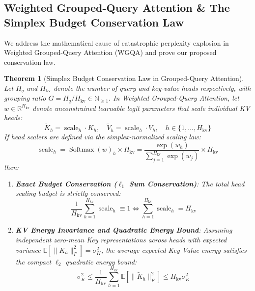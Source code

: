 \documentclass{article}
\newtheorem{theorem}{Theorem}
\begin{document}
\subsection{Weighted Grouped-Query Attention \& The Simplex Budget Conservation Law}
We address the mathematical cause of catastrophic perplexity explosion in Weighted Grouped-Query Attention (WGQA) and prove our proposed conservation law.

\begin{theorem}[Simplex Budget Conservation Law in Grouped-Query Attention]
\label{thm:simplex_conservation}
Let $H_q$ and $H_{\text{kv}}$ denote the number of query and key-value heads respectively, with grouping ratio $G = H_q / H_{\text{kv}} \in \mathbb{N}_{\ge 1}$. In Weighted Grouped-Query Attention, let $w \in \mathbb{R}^{H_{\text{kv}}}$ denote unconstrained learnable logit parameters that scale individual KV heads:
\begin{equation}
    \tilde{K}_h = \operatorname{scale}_h \cdot K_h, \quad \tilde{V}_h = \operatorname{scale}_h \cdot V_h, \quad h \in \{1, \dots, H_{\text{kv}}\}
\end{equation}
If head scalers are defined via the simplex-normalized scaling law:
\begin{equation}
    \operatorname{scale}_h = \operatorname{Softmax}(w)_h \times H_{\text{kv}} = \frac{\exp(w_h)}{\sum_{j=1}^{H_{\text{kv}}} \exp(w_j)} \times H_{\text{kv}}
\end{equation}
then:
\begin{enumerate}
    \item \textbf{Exact Budget Conservation ($\ell_1$ Sum Conservation)}: The total head scaling budget is strictly conserved:
    \begin{equation}
        \frac{1}{H_{\text{kv}}} \sum_{h=1}^{H_{\text{kv}}} \operatorname{scale}_h \equiv 1 \iff \sum_{h=1}^{H_{\text{kv}}} \operatorname{scale}_h = H_{\text{kv}}
    \end{equation}
    \item \textbf{KV Energy Invariance and Quadratic Energy Bound}: Assuming independent zero-mean Key representations across heads with expected variance $\mathbb{E}[\|K_h\|_F^2] = \sigma_K^2$, the average expected Key-Value energy satisfies the compact $\ell_2$ quadratic energy bound:
    \begin{equation}
        \sigma_K^2 \le \frac{1}{H_{\text{kv}}} \sum_{h=1}^{H_{\text{kv}}} \mathbb{E}\left[\|\tilde{K}_h\|_F^2\right] \le H_{\text{kv}} \sigma_K^2
    \end{equation}

\end{enumerate}
\end{theorem}
\end{document}
